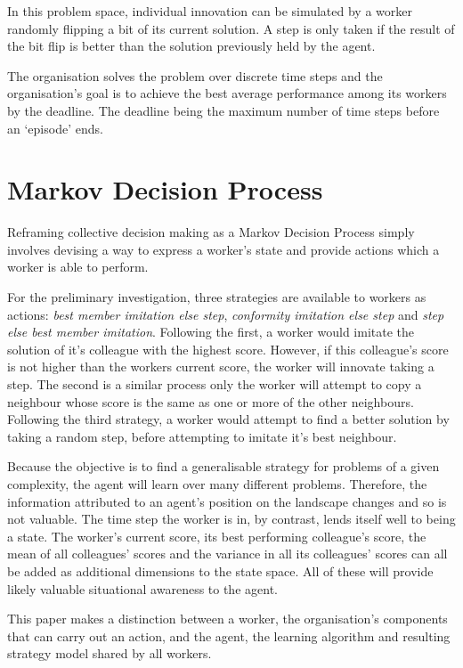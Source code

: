 \documentclass[conference]{IEEEtran}
\begin{document}
In this problem space,
individual innovation can be simulated
by a worker randomly flipping a bit of its current solution.
A step is only taken if the result of the bit flip is better
than the solution previously held by the agent.

The organisation solves the problem over discrete time steps
and the organisation's goal is to achieve
the best average performance among its workers
by the deadline.
The deadline being the maximum number of time steps before an `episode' ends.


\section{Markov Decision Process}\label{mdp}

Reframing collective decision making as a Markov Decision Process
simply involves devising a way to express a worker's state
and provide actions which a worker is able to perform.

For the preliminary investigation,
three strategies are available to workers as actions:
\emph{best member imitation else step},
\emph{conformity imitation else step} and
\emph{step else best member imitation}.
Following the first, a worker would imitate the solution
of it's colleague with the highest score.
However, if this colleague's score is not higher
than the workers current score,
the worker will innovate taking a step.
The second is a similar process only the worker will attempt
to copy a neighbour
whose score is the same as one or more of the other neighbours.
Following the third strategy,
a worker would attempt to find a better solution by taking a random step,
before attempting to imitate it's best neighbour.

Because the objective is to find a generalisable strategy
for problems of a given complexity,
the agent will learn over many different problems.
Therefore, the information attributed to an agent's position
on the landscape changes and so is not valuable.
The time step the worker is in, by contrast, lends itself well to being a state.
The worker's current score, its best performing colleague's score,
the mean of all colleagues' scores
and the variance in all its colleagues' scores
can all be added as additional dimensions to the state space.
All of these will provide likely valuable situational awareness to the agent.

This paper makes a distinction between a worker,
the organisation's components that can carry out an action,
and the agent,
the learning algorithm and resulting strategy model shared by all workers.
\end{document}
